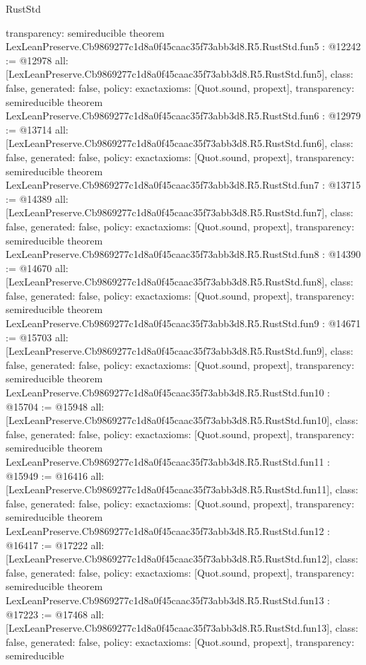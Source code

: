 \begin{lexlean}{RustStd}
\begin{coremodule}
{  transparency: semireducible
}
theorem LexLeanPreserve.Cb9869277c1d8a0f45caac35f73abb3d8.R5.RustStd.fun5 : @12242 := @12978 {
  all: [LexLeanPreserve.Cb9869277c1d8a0f45caac35f73abb3d8.R5.RustStd.fun5],
  class: false,
  generated: false,
  policy: exact{axioms: [Quot.sound, propext]},
  transparency: semireducible
}
theorem LexLeanPreserve.Cb9869277c1d8a0f45caac35f73abb3d8.R5.RustStd.fun6 : @12979 := @13714 {
  all: [LexLeanPreserve.Cb9869277c1d8a0f45caac35f73abb3d8.R5.RustStd.fun6],
  class: false,
  generated: false,
  policy: exact{axioms: [Quot.sound, propext]},
  transparency: semireducible
}
theorem LexLeanPreserve.Cb9869277c1d8a0f45caac35f73abb3d8.R5.RustStd.fun7 : @13715 := @14389 {
  all: [LexLeanPreserve.Cb9869277c1d8a0f45caac35f73abb3d8.R5.RustStd.fun7],
  class: false,
  generated: false,
  policy: exact{axioms: [Quot.sound, propext]},
  transparency: semireducible
}
theorem LexLeanPreserve.Cb9869277c1d8a0f45caac35f73abb3d8.R5.RustStd.fun8 : @14390 := @14670 {
  all: [LexLeanPreserve.Cb9869277c1d8a0f45caac35f73abb3d8.R5.RustStd.fun8],
  class: false,
  generated: false,
  policy: exact{axioms: [Quot.sound, propext]},
  transparency: semireducible
}
theorem LexLeanPreserve.Cb9869277c1d8a0f45caac35f73abb3d8.R5.RustStd.fun9 : @14671 := @15703 {
  all: [LexLeanPreserve.Cb9869277c1d8a0f45caac35f73abb3d8.R5.RustStd.fun9],
  class: false,
  generated: false,
  policy: exact{axioms: [Quot.sound, propext]},
  transparency: semireducible
}
theorem LexLeanPreserve.Cb9869277c1d8a0f45caac35f73abb3d8.R5.RustStd.fun10 : @15704 := @15948 {
  all: [LexLeanPreserve.Cb9869277c1d8a0f45caac35f73abb3d8.R5.RustStd.fun10],
  class: false,
  generated: false,
  policy: exact{axioms: [Quot.sound, propext]},
  transparency: semireducible
}
theorem LexLeanPreserve.Cb9869277c1d8a0f45caac35f73abb3d8.R5.RustStd.fun11 : @15949 := @16416 {
  all: [LexLeanPreserve.Cb9869277c1d8a0f45caac35f73abb3d8.R5.RustStd.fun11],
  class: false,
  generated: false,
  policy: exact{axioms: [Quot.sound, propext]},
  transparency: semireducible
}
theorem LexLeanPreserve.Cb9869277c1d8a0f45caac35f73abb3d8.R5.RustStd.fun12 : @16417 := @17222 {
  all: [LexLeanPreserve.Cb9869277c1d8a0f45caac35f73abb3d8.R5.RustStd.fun12],
  class: false,
  generated: false,
  policy: exact{axioms: [Quot.sound, propext]},
  transparency: semireducible
}
theorem LexLeanPreserve.Cb9869277c1d8a0f45caac35f73abb3d8.R5.RustStd.fun13 : @17223 := @17468 {
  all: [LexLeanPreserve.Cb9869277c1d8a0f45caac35f73abb3d8.R5.RustStd.fun13],
  class: false,
  generated: false,
  policy: exact{axioms: [Quot.sound, propext]},
  transparency: semireducible
}
\end{coremodule}
\end{lexlean}
